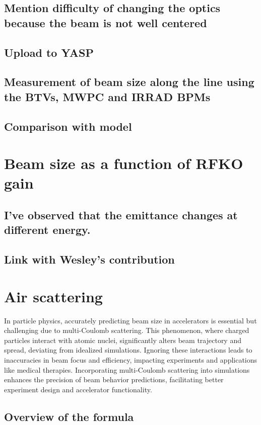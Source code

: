 \documentclass[a4paper,
               biblatex,     %
               ]{jacow}
\begin{document}
\subsection{Mention difficulty of changing the optics because the beam is not well centered}
\subsection{Upload to YASP}
\subsection{Measurement of beam size along the line using the BTVs, MWPC and IRRAD BPMs}
\subsection{Comparison with model}

\section{Beam size as a function of RFKO gain}
\subsection{I've observed that the emittance changes at different energy.}
\subsection{Link with Wesley's contribution}

\section{Air scattering}

In particle physics, accurately predicting beam size in accelerators is essential but challenging due to multi-Coulomb scattering. This phenomenon, where charged particles interact with atomic nuclei, significantly alters beam trajectory and spread, deviating from idealized simulations. Ignoring these interactions leads to inaccuracies in beam focus and efficiency, impacting experiments and applications like medical therapies. Incorporating multi-Coulomb scattering into simulations enhances the precision of beam behavior predictions, facilitating better experiment design and accelerator functionality.

\subsection{Overview of the formula}
\end{document}
